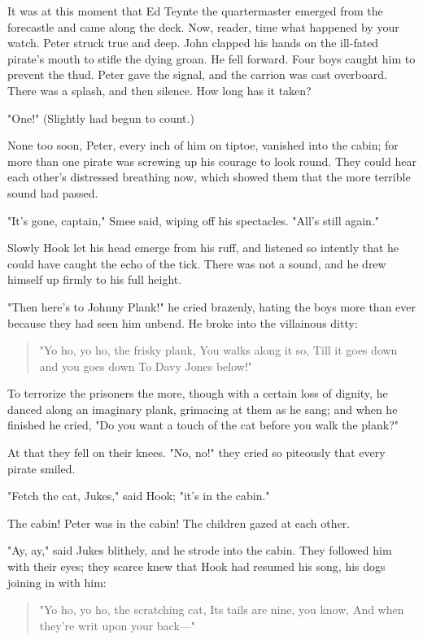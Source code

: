 It was at this moment that Ed Teynte the quartermaster emerged from the
forecastle and came along the deck. Now, reader, time what happened by
your watch. Peter struck true and deep. John clapped his hands on the
ill-fated pirate's mouth to stifle the dying groan. He fell forward. Four
boys caught him to prevent the thud. Peter gave the signal, and the
carrion was cast overboard. There was a splash, and then silence. How long
has it taken?


"One!" (Slightly had begun to count.)


None too soon, Peter, every inch of him on tiptoe, vanished into the
cabin; for more than one pirate was screwing up his courage to look round.
They could hear each other's distressed breathing now, which showed them
that the more terrible sound had passed.


"It's gone, captain," Smee said, wiping off his spectacles. "All's still
again."


Slowly Hook let his head emerge from his ruff, and listened so intently
that he could have caught the echo of the tick. There was not a sound, and
he drew himself up firmly to his full height.


"Then here's to Johnny Plank!" he cried brazenly, hating the boys more
than ever because they had seen him unbend. He broke into the villainous
ditty:

\begin{verse}
     "Yo ho, yo ho, the frisky plank,
     You walks along it so,
     Till it goes down and you goes down
     To Davy Jones below!"
\end{verse}

To terrorize the prisoners the more, though with a certain loss of
dignity, he danced along an imaginary plank, grimacing at them as he sang;
and when he finished he cried, "Do you want a touch of the cat before you walk the plank?"


At that they fell on their knees. "No, no!" they cried so piteously that
every pirate smiled.


"Fetch the cat, Jukes," said Hook; "it's in the cabin."


The cabin! Peter was in the cabin! The children gazed at each other.


"Ay, ay," said Jukes blithely, and he strode into the cabin. They followed
him with their eyes; they scarce knew that Hook had resumed his song, his
dogs joining in with him:

\begin{verse}
"Yo ho, yo ho, the scratching cat,
Its tails are nine, you know,
And when they're writ upon your back—"
\end{verse}

